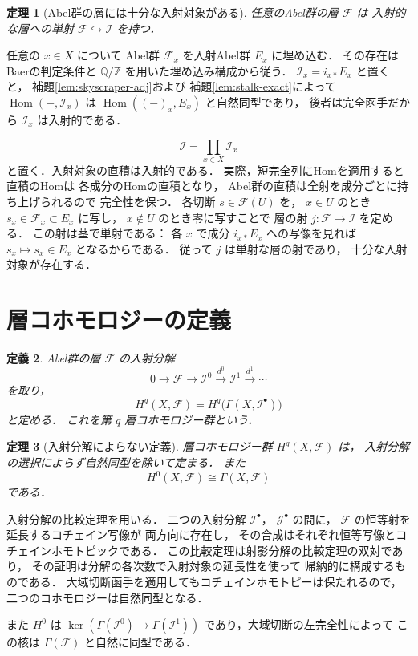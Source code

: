 \documentclass[a5paper,10pt,onecolumn]{jsarticle}
\makeatletter
\theoremstyle{mathnotetheorem}
\newtheorem{theorem}{定理}[section]
\newtheorem{definition}[theorem]{定義}
\renewcommand{\proofname}{証明}
\renewenvironment{proof}[1][\proofname]{%
  \par\pushQED{\qed}\normalfont\topsep4\p@\@plus2\p@\relax
  \trivlist\item[\hskip\labelsep\bfseries #1]\ignorespaces
}{\popQED\endtrivlist\@endpefalse}
\makeatother
\begin{document}
\begin{theorem}[Abel群の層には十分な入射対象がある]
\label{thm:enough-injective}
任意のAbel群の層 $\mathcal F$ は
入射的な層への単射
$\mathcal F\hookrightarrow\mathcal I$ を持つ．
\end{theorem}
\begin{proof}
任意の $x\in X$ について
Abel群 $\mathcal F_x$ を入射Abel群 $E_x$ に埋め込む．
その存在はBaerの判定条件と
$\mathbb Q/\mathbb Z$ を用いた埋め込み構成から従う．
$\mathcal I_x=i_{x*}E_x$ と置くと，
補題\ref{lem:skyscraper-adj}および
補題\ref{lem:stalk-exact}によって
$\operatorname{Hom}(-,\mathcal I_x)$ は
$\operatorname{Hom}((-)_{x},E_x)$ と自然同型であり，
後者は完全函手だから $\mathcal I_x$ は入射的である．

\[
 \mathcal I=\prod_{x\in X}\mathcal I_x
\]
と置く．入射対象の直積は入射的である．
実際，短完全列にHomを適用すると直積のHomは
各成分のHomの直積となり，
Abel群の直積は全射を成分ごとに持ち上げられるので
完全性を保つ．
各切断 $s\in\mathcal F(U)$ を，
$x\in U$ のとき $s_x\in\mathcal F_x\subset E_x$ に写し，
$x\notin U$ のとき零に写すことで
層の射 $j:\mathcal F\to\mathcal I$ を定める．
この射は茎で単射である：
各 $x$ で成分 $i_{x*}E_x$ への写像を見れば
$s_x\mapsto s_x\in E_x$ となるからである．
従って $j$ は単射な層の射であり，
十分な入射対象が存在する．
\end{proof}

\section{層コホモロジーの定義}

\begin{definition}
Abel群の層 $\mathcal F$ の入射分解
\[
 0\to\mathcal F\to\mathcal I^0
 \xrightarrow{d^0}\mathcal I^1
 \xrightarrow{d^1}\cdots
\]
を取り，
\[
 H^q(X,\mathcal F)
 =H^q\bigl(\Gamma(X,\mathcal I^\bullet)\bigr)
\]
と定める．
これを第 $q$ 層コホモロジー群という．
\end{definition}

\begin{theorem}[入射分解によらない定義]\label{thm:sheaf-wd}
層コホモロジー群 $H^q(X,\mathcal F)$ は，
入射分解の選択によらず自然同型を除いて定まる．
また
\[
 H^0(X,\mathcal F)\cong\Gamma(X,\mathcal F)
\]
である．
\end{theorem}
\begin{proof}
入射分解の比較定理を用いる．
二つの入射分解 $\mathcal I^\bullet$，
$\mathcal J^\bullet$ の間に，
$\mathcal F$ の恒等射を延長するコチェイン写像が
両方向に存在し，
その合成はそれぞれ恒等写像とコチェインホモトピックである．
この比較定理は射影分解の比較定理の双対であり，
その証明は分解の各次数で入射対象の延長性を使って
帰納的に構成するものである．
大域切断函手を適用してもコチェインホモトピーは保たれるので，
二つのコホモロジーは自然同型となる．

また $H^0$ は
$\ker(\Gamma(\mathcal I^0)\to\Gamma(\mathcal I^1))$
であり，大域切断の左完全性によって
この核は $\Gamma(\mathcal F)$ と自然に同型である．
\end{proof}
\end{document}
